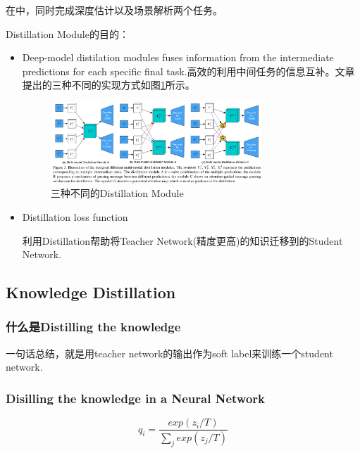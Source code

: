 在\cite{Xu2018PADNet}中，同时完成深度估计以及场景解析两个任务。

Distillation Module的目的：
\begin{itemize}
\item Deep-model distilation modules fuses information from the intermediate predictions for each specific final task\cite{Xu2018PADNet}.高效的利用中间任务的信息互补。文章\cite{Xu2018PADNet}提出的三种不同的实现方式如图\ref{ThreeDistillationModules1}所示。

\begin{figure}[!hbtp]
\centering
\includegraphics[width=0.75\textwidth]{DLTips/ThreeDistillationModules1.png}
\caption{三种不同的Distillation Module}
\label{ThreeDistillationModules1}
\end{figure}

\item Distillation loss function\cite{Mehta2018OD200}

利用Distillation帮助将Teacher Network(精度更高)的知识迁移到的Student Network.

\end{itemize}

\subsection{Knowledge Distillation}

\subsubsection{什么是Distilling the knowledge}

一句话总结，就是用teacher network的输出作为soft label来训练一个student network.

\subsubsection{Disilling the knowledge in a Neural Network}

\begin{displaymath}
q_i = \frac{exp(z_i/T)}{\sum_{j}exp(z_j/T)}
\end{displaymath}

